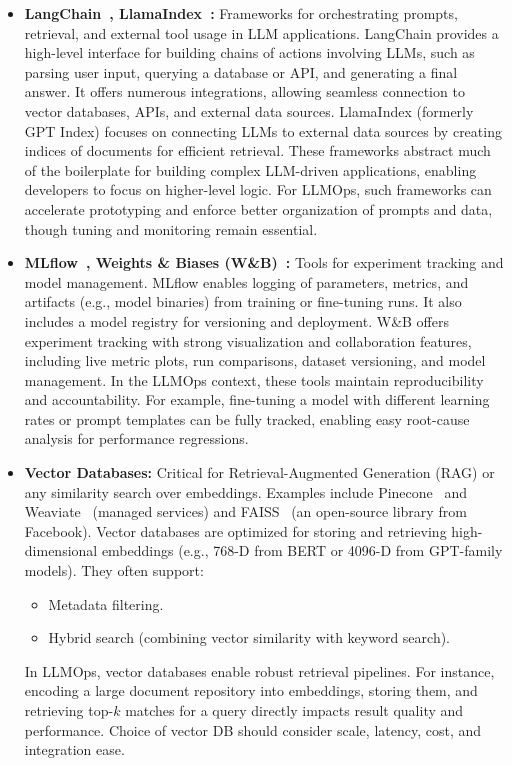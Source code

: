 \begin{itemize}
    \item \textbf{LangChain~\cite{LangChain2023Framework}, LlamaIndex~\cite{llamaindex_rag_docs}:} Frameworks for orchestrating prompts, retrieval, and external tool usage in LLM applications.  
    LangChain provides a high-level interface for building chains of actions involving LLMs, such as parsing user input, querying a database or API, and generating a final answer. It offers numerous integrations, allowing seamless connection to vector databases, APIs, and external data sources.  
    LlamaIndex (formerly GPT Index) focuses on connecting LLMs to external data sources by creating indices of documents for efficient retrieval. These frameworks abstract much of the boilerplate for building complex LLM-driven applications, enabling developers to focus on higher-level logic.  
    For LLMOps, such frameworks can accelerate prototyping and enforce better organization of prompts and data, though tuning and monitoring remain essential.

    \item \textbf{MLflow~\cite{mlflow}, Weights \& Biases (W\&B)~\cite{wandb}:} Tools for experiment tracking and model management.  
    MLflow enables logging of parameters, metrics, and artifacts (e.g., model binaries) from training or fine-tuning runs. It also includes a model registry for versioning and deployment.  
    W\&B offers experiment tracking with strong visualization and collaboration features, including live metric plots, run comparisons, dataset versioning, and model management.  
    In the LLMOps context, these tools maintain reproducibility and accountability. For example, fine-tuning a model with different learning rates or prompt templates can be fully tracked, enabling easy root-cause analysis for performance regressions.

    \item \textbf{Vector Databases:} Critical for Retrieval-Augmented Generation (RAG) or any similarity search over embeddings.  
    Examples include Pinecone~\cite{pinecone_hybrid_docs} and Weaviate~\cite{weaviate_hybrid_docs} (managed services) and FAISS~\cite{Johnson2019FAISS} (an open-source library from Facebook). Vector databases are optimized for storing and retrieving high-dimensional embeddings (e.g., 768-D from BERT or 4096-D from GPT-family models). They often support:
    \begin{itemize}
        \item Metadata filtering.
        \item Hybrid search (combining vector similarity with keyword search).
    \end{itemize}
    In LLMOps, vector databases enable robust retrieval pipelines. For instance, encoding a large document repository into embeddings, storing them, and retrieving top-$k$ matches for a query directly impacts result quality and performance. Choice of vector DB should consider scale, latency, cost, and integration ease.


\end{itemize}
